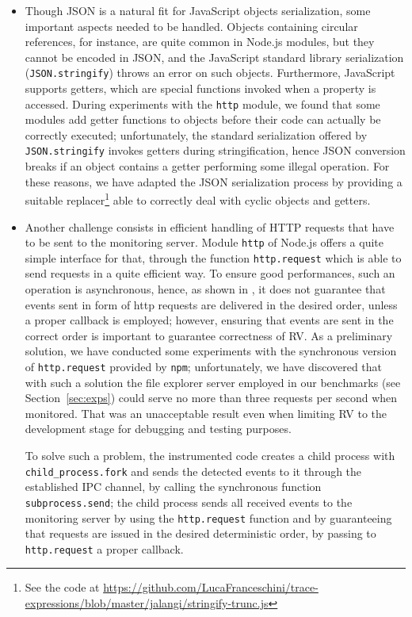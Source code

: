 \begin{itemize}
\item Though JSON is a natural fit for JavaScript objects serialization, some important aspects needed to be handled.
Objects containing circular references, for instance, are quite common in Node.js modules, but they cannot be encoded in JSON, and the JavaScript standard library serialization (\lstinline|JSON.stringify|) throws an error on such objects.
Furthermore, JavaScript supports getters, which are special functions invoked when a property is accessed.
During experiments with the \lstinline{http} module, we found that some modules add getter functions to objects before their code can actually be
correctly executed; unfortunately, the standard serialization offered by \lstinline|JSON.stringify| invokes getters during stringification, hence
JSON conversion  breaks if an object contains a getter performing some illegal operation. 
For these reasons, we have  adapted the JSON serialization process by providing a suitable replacer\footnote{See the code at \url{https://github.com/LucaFranceschini/trace-expressions/blob/master/jalangi/stringify-trunc.js}} able to correctly deal
with cyclic objects and getters.

\item Another challenge consists in efficient handling of HTTP requests that have to be sent to the 
  monitoring server. Module \lstinline{http} of Node.js offers a quite simple interface for that, through the  function
  \lstinline{http.request} which is able to send requests in a quite efficient way. To ensure good performances, such an operation is
  asynchronous, hence, as shown in , it does not guarantee that events sent in form of http requests are delivered in the  
  desired order, unless a proper callback is employed; however, ensuring that events are sent in the correct order is important to guarantee correctness of RV. As a preliminary solution, we have conducted some experiments with the
  synchronous version of \lstinline{http.request} provided by \lstinline{npm}; unfortunately, we have discovered that with such a solution
  the file explorer server employed in our benchmarks (see Section~\ref{sec:exps}) could serve no more than
  three requests per second when monitored. That was an unacceptable result even when limiting RV to the development stage
  for debugging and testing purposes.

  To solve such a problem, the instrumented code creates a child process with \lstinline{child_process.fork} and
  sends the detected events to it through the established IPC channel, by calling the synchronous function \lstinline{subprocess.send};
  the child process sends all received events to the monitoring server by using the \lstinline{http.request} function and by guaranteeing
  that requests are issued in the desired deterministic order, by passing to \lstinline{http.request} a proper callback.
\end{itemize}

